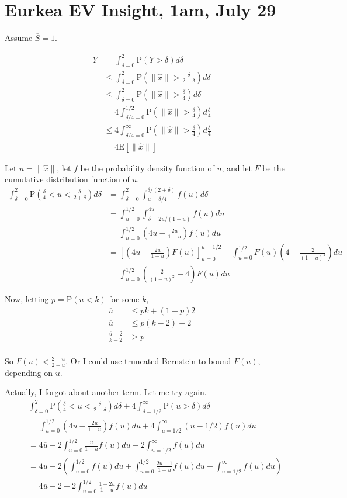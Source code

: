\documentclass{article}
\newcommand \E[1] {\mathrm E \left[#1\right]} %
\newcommand \p[1] {\mathrm P \left(#1\right)}
\begin{document}
\section{Eurkea EV Insight, 1am, July 29}

Assume $\overline S = 1$.

\begin{align*}
\overline Y &= \int_{\delta=0}^2 \p{Y>\delta} d\delta \\
&\leq \int_{\delta=0}^2 \p{\|\hat x\|>\frac\delta{2+\delta}} d\delta \\
&\leq \int_{\delta=0}^2 \p{\|\hat x\| > \frac\delta 4} d\delta \\
&= 4 \int_{\delta/4 = 0}^{1/2} \p{\|\hat x\| > \frac \delta 4} d\frac\delta 4 \\
&\leq 4 \int_{\delta/4=0}^\infty \p{\|\hat x\| > \frac \delta 4} d\frac\delta 4 \\
&= 4\E{\|\hat x\|}
\end{align*}

Let $u=\|\hat x\|$, let $f$ be the probability density function of $u$, and let $F$ be the cumulative distribution function of $u$.
\begin{align*}
\int_{\delta=0}^2 \p{\frac \delta 4 < u < \frac \delta {2+\delta}} d\delta &= \int_{\delta=0}^2 \int_{u=\delta/4}^{\delta/(2+\delta)} f(u) d\delta \\
&= \int_{u=0}^{1/2} \int_{\delta=2u/(1-u)}^{4u} f(u) du \\
&= \int_{u=0}^{1/2} \left(4u-\frac{2u}{1-u}\right) f(u) du \\
&= \left[\left(4u-\frac{2u}{1-u}\right)F(u)\right]_{u=0}^{u=1/2} - \int_{u=0}^{1/2} F(u)\left(4-\frac{2}{(1-u)^2}\right) du \\
&= \int_{u=0}^{1/2} \left(\frac{2}{(1-u)^2}-4\right)F(u) du
\end{align*}

Now, letting $p=\p{u<k}$ for some $k$,
\begin{align*}
\overline u &\leq pk+(1-p)2 \\
\overline u &\leq p(k-2) + 2 \\
\frac{\overline u - 2}{k-2} &>p \\
\end{align*}

So $F(u)<\frac{2-\overline u}{2-u}$. Or I could use truncated Bernstein to bound $F(u)$, depending on $\overline u$.

Actually, I forgot about another term. Let me try again.
\begin{align*}
&\int_{\delta=0}^2 \p{\frac \delta 4 < u < \frac \delta {2+\delta}}d\delta + 4\int_{\delta=1/2}^\infty \p{u>\delta}d\delta \\
&= \int_{u=0}^{1/2} \left(4u-\frac{2u}{1-u}\right) f(u) du + 4\int_{u=1/2}^\infty (u-1/2)f(u) du \\
&= 4\overline u - 2\int_{u=0}^{1/2} \frac{u}{1-u}f(u)du - 2\int_{u=1/2}^\infty f(u) du \\
&= 4\overline u -2\left( \int_{u=0}^{1/2} f(u)du + \int_{u=0}^{1/2} \frac{2u-1}{1-u}f(u)du + \int_{u=1/2}^\infty f(u)du \right) \\
&= 4\overline u - 2 + 2\int_{u=0}^{1/2} \frac{1-2u}{1-u} f(u) du
\end{align*}
\end{document}
